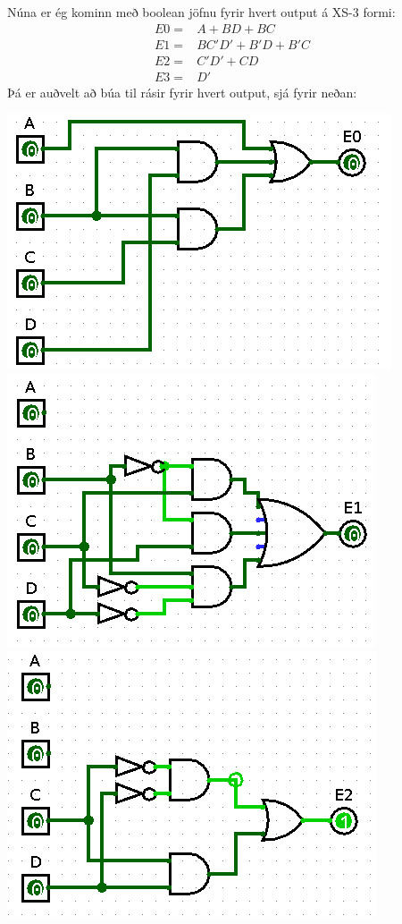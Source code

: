\documentclass{article}
\begin{document}
Núna er ég kominn með boolean jöfnu fyrir hvert output á XS-3 formi:
\begin{align*}
    E0=&A+BD+BC\\
    E1=&BC'D'+B'D+B'C\\
    E2=&C'D'+CD\\
    E3=&D'
\end{align*}
Þá er auðvelt að búa til rásir fyrir hvert output, sjá fyrir neðan:
\begin{center}
    \includegraphics[scale=0.2]{sc1.png}
    \includegraphics[scale=0.2]{sc2.png}
    \includegraphics[scale=0.2]{sc4.png}

\end{center}
\end{document}
